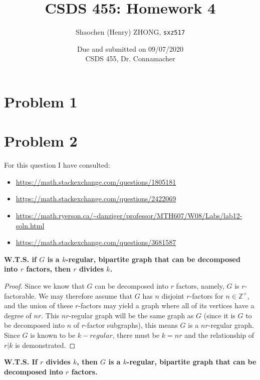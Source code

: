 \documentclass[11pt]{article}
\newcommand{\ilc}{\texttt}
\begin{document}
\title{\textbf{CSDS 455: Homework 4}}

\author{Shaochen (Henry) ZHONG, \ilc{sxz517}}
\date{Due and submitted on 09/07/2020 \\ CSDS 455, Dr. Connamacher}
\maketitle

\section{Problem 1}


\section{Problem 2}

For this question I have consulted:
\begin{itemize}
    \item \url{https://math.stackexchange.com/questions/1805181}
    \item \url{https://math.stackexchange.com/questions/2422069}
    \item \url{https://math.ryerson.ca/~danziger/professor/MTH607/W08/Labs/lab12-soln.html}
    \item \url{https://math.stackexchange.com/questions/3681587}
\end{itemize}

\noindent\textbf{W.T.S. if $G$ is a $k$-regular, bipartite graph that can be decomposed into $r$ factors, then $r$ divides $k$.}
\begin{proof}
Since we know that $G$ can be decomposed into $r$ factors, namely, $G$ is $r$-factorable. We may therefore assume that $G$ has $n$ disjoint $r$-factors for $n \in \mathbb{Z}^+$, and the union of these $r$-factors may yield a graph where all of its vertices have a degree of $nr$. This $nr$-regular graph will be the same graph as $G$ (since it is $G$ to be decomposed into $n$ of $r$-factor subgraphs), this means $G$ is a $nr$-regular graph. Since $G$ is known to be $k-regular$, there must be $k = nr$ and the relationship of $r | k$ is demonstrated.
\end{proof}


\noindent\textbf{W.T.S. If $r$ divides $k$, then $G$ is a $k$-regular, bipartite graph that can be decomposed into $r$ factors.}
\end{document}
